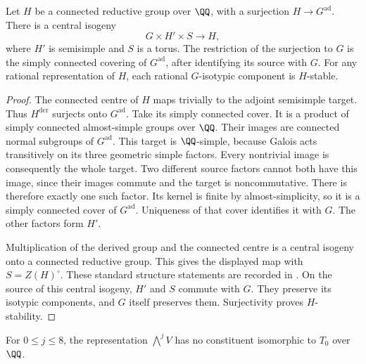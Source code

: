 \begin{lemma}\label{round26:carrier:quotient-lift}
Let $H$ be a connected reductive group over $\QQ$, with a
surjection $H\to G^{\mathrm{ad}}$. There is a central isogeny
\[
 G\times H'\times S\longrightarrow H,
\]
where $H'$ is semisimple and $S$ is a torus. The restriction
of the surjection to $G$ is the simply connected covering of
$G^{\mathrm{ad}}$, after identifying its source with $G$.
For any rational representation of $H$, each rational
$G$-isotypic component is $H$-stable.
\end{lemma}

\begin{proof}
The connected centre of $H$ maps trivially to the adjoint
semisimple target. Thus $H^{\mathrm{der}}$ surjects onto
$G^{\mathrm{ad}}$. Take its simply connected cover. It is a
product of simply connected almost-simple groups over $\QQ$.
Their images are connected normal subgroups of
$G^{\mathrm{ad}}$. This target is $\QQ$-simple, because Galois
acts transitively on its three geometric simple factors.
Every nontrivial image is consequently the whole target.
Two different source factors cannot both have this image,
since their images commute and the target is noncommutative.
There is therefore exactly one such factor. Its kernel is
finite by almost-simplicity, so it is a simply connected cover
of $G^{\mathrm{ad}}$. Uniqueness of that cover identifies it
with $G$. The other factors form $H'$.

Multiplication of the derived group and the connected centre
is a central isogeny onto a connected reductive group. This
gives the displayed map with $S=Z(H)^\circ$. These standard
structure statements are recorded in \cite[Proposition~21.60,
Theorems~21.51 and~24.3]{Round26Milne17}.
On the source of this central isogeny, $H'$ and $S$ commute
with $G$. They preserve its isotypic components, and $G$
itself preserves them. Surjectivity proves $H$-stability.
\end{proof}

\begin{lemma}\label{round26:carrier:no-exterior-adjoint}
For $0\le j\le8$, the representation $\bigwedge^jV$ has no
constituent isomorphic to $T_0$ over $\QQ$.
\end{lemma}

